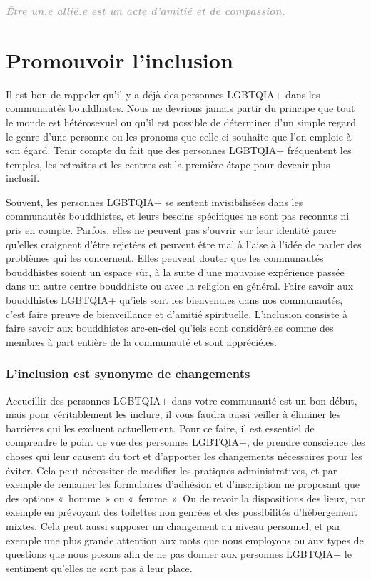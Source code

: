 \documentclass[12pt,openany]{book}
\renewenvironment{quote}{%
  \list{}{%
    \leftmargin-0.1cm   %
    \rightmargin\leftmargin
  }
  \item\relax
}
{\endlist}
\begin{document}
\begin{quote}
\textit{\large \textbf{\textcolor{darkgray}{Être un.e allié.e est un acte d’amitié et de compassion.}}}
\end{quote}

\section*{Promouvoir l’inclusion}

\noindent Il est bon de rappeler qu’il y a déjà des personnes \mbox{LGBTQIA+} dans les communautés bouddhistes. Nous ne devrions jamais partir du principe que tout le monde est hétérosexuel ou qu’il est possible de déterminer d’un simple regard le genre d’une personne ou les pronoms que celle-ci souhaite que l’on emploie à son égard. Tenir compte du fait que des personnes \mbox{LGBTQIA+} fréquentent les temples, les retraites et les centres est la première étape pour devenir plus inclusif.

Souvent, les personnes \mbox{LGBTQIA+} se sentent invisibilisées dans les communautés bouddhistes, et leurs besoins spécifiques ne sont pas reconnus ni pris en compte. Parfois, elles ne peuvent pas s’ouvrir sur leur identité parce qu’elles craignent d’être rejetées et peuvent être mal à l’aise à l’idée de parler des problèmes qui les concernent. Elles peuvent douter que les communautés bouddhistes soient un espace sûr, à la suite d’une mauvaise expérience passée dans un autre centre bouddhiste ou avec la religion en général. Faire savoir aux bouddhistes \mbox{LGBTQIA+} qu’iels sont les bienvenu.es dans nos communautés, c’est faire preuve de bienveillance et d’amitié spirituelle. L’inclusion consiste à faire savoir aux bouddhistes arc-en-ciel qu’iels sont considéré.es comme des membres à part entière de la communauté et sont apprécié.es.

\subsubsection*{L’inclusion est synonyme de changements}

\noindent Accueillir des personnes \mbox{LGBTQIA+} dans votre communauté est un bon début, mais pour véritablement les inclure, il vous faudra aussi veiller à éliminer les barrières qui les excluent actuellement. Pour ce faire, il est essentiel de comprendre le point de vue des personnes \mbox{LGBTQIA+}, de prendre conscience des choses qui leur causent du tort et d’apporter les changements nécessaires pour les éviter. Cela peut nécessiter de modifier les pratiques administratives, et par exemple de remanier les formulaires d’adhésion et d’inscription ne proposant que des options \mbox{« homme »} ou \mbox{« femme »}. Ou de revoir la dispositions des lieux, par exemple en prévoyant des toilettes non genrées et des possibilités d’hébergement mixtes. Cela peut aussi supposer un changement au niveau personnel, et par exemple une plus grande attention aux mots que nous employons ou aux types de questions que nous posons afin de ne pas donner aux personnes \mbox{LGBTQIA+} le sentiment qu’elles ne sont pas à leur place.
\end{document}
